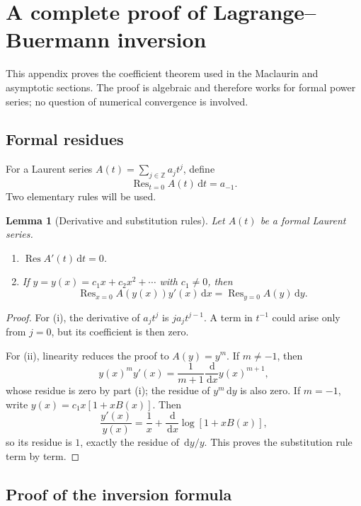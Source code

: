 \documentclass[11pt]{article}
\newtheorem{lemma}[lemma]{Lemma}
\theoremstyle{remark}
\newcommand{\Res}{\operatorname{Res}}
\newcommand{\dd}{\,\mathrm d}
\begin{document}
\clearpage
\appendix

\section{A complete proof of Lagrange--Buer\-mann inversion}
\label{app:lagrange}

This appendix proves the coefficient theorem used in the Maclaurin and
asymptotic sections.  The proof is algebraic and therefore works for formal
power series; no question of numerical convergence is involved.

\subsection{Formal residues}

For a Laurent series \(A(t)=\sum_{j\in\mathbb Z}a_jt^j\), define
\[
       \Res_{t=0} A(t)\dd t=a_{-1}.
\]
Two elementary rules will be used.

\begin{lemma}[Derivative and substitution rules]\label{lem:formal-residue}
Let \(A(t)\) be a formal Laurent series.
\begin{enumerate}[label=\textup{(\roman*)}]
\item \(\Res A'(t)\dd t=0\).
\item If \(y=y(x)=c_1x+c_2x^2+\cdots\) with \(c_1\neq0\), then
\begin{equation}\label{eq:formal-change}
       \Res_{x=0}A(y(x))y'(x)\dd x
       =\Res_{y=0}A(y)\dd y.
\end{equation}
\end{enumerate}
\end{lemma}

\begin{proof}
For (i), the derivative of \(a_jt^j\) is \(ja_jt^{j-1}\).  A term in
\(t^{-1}\) could arise only from \(j=0\), but its coefficient is then zero.

For (ii), linearity reduces the proof to \(A(y)=y^m\).  If \(m\neq-1\),
then
\[
       y(x)^m y'(x)
       =\frac1{m+1}\frac{\dd}{\dd x}y(x)^{m+1},
\]
whose residue is zero by part (i); the residue of \(y^m\dd y\) is also zero.
If \(m=-1\), write \(y(x)=c_1x[1+xB(x)]\).  Then
\[
       \frac{y'(x)}{y(x)}
       =\frac1x+\frac{\dd}{\dd x}\log[1+xB(x)],
\]
so its residue is \(1\), exactly the residue of \(\dd y/y\).  This proves
the substitution rule term by term.
\end{proof}

\subsection{Proof of the inversion formula}
\end{document}
